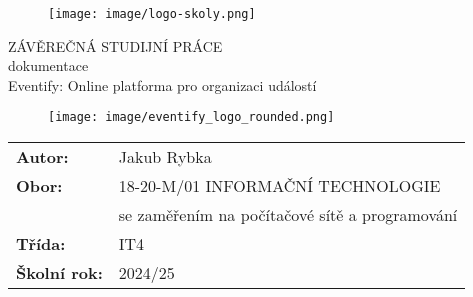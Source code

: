 \documentclass[12pt, a4paper,
twoside,        %
openright
]{report}
\title{\nazevPrace} %
\author{\jmenoAutora} %
\date{\datumOdevzdani} %
\newcommand\obor{INFORMAČNÍ TECHNOLOGIE} %
\newcommand\kodOboru{18-20-M/01} %
\newcommand\zamereni{se zaměřením na počítačové sítě a programování} %
\newcommand\trida{IT4} %
\newcommand\jmenoAutora{Jakub Rybka}  %
\newcommand\skolniRok{2024/25}%
\newcommand\nazevPrace{Eventify: Online platforma pro organizaci událostí } %
\begin{document}
	
	\pagestyle{empty}
	
	\cleardoublepage

	
	{\selectfont
		\begin{figure}[h]
			\centering
			\texttt{[image: image/logo-skoly.png]} 
		\end{figure}
		
		
		{\bfseries %
			\begin{center}
				\vspace{0.025 \textheight}
				\LARGE{ZÁVĚREČNÁ STUDIJNÍ PRÁCE}\\
				\large{dokumentace}\\
				\vspace{0.075 \textheight}
				\LARGE {\nazevPrace}\\
			\end{center}  
		}%
		
		\begin{figure}[h]
			\centering
			\texttt{[image: image/eventify\_logo\_rounded.png]} 
		\end{figure}
		
		\vspace{0.02 \textheight}
		\begin{table}[h!]
			\begin{tabular}{ll}
				\textbf{Autor:} & \jmenoAutora\\ 
				\textbf{Obor:} & \kodOboru { } \obor\\
				\textbf{} & \zamereni\\
				\textbf{Třída:} & \trida\\
				\textbf{Školní rok:} & \skolniRok\\
			\end{tabular}
			
		\end{table}		
	}
	
\cleardoublepage %
	

	
	
\end{document}
